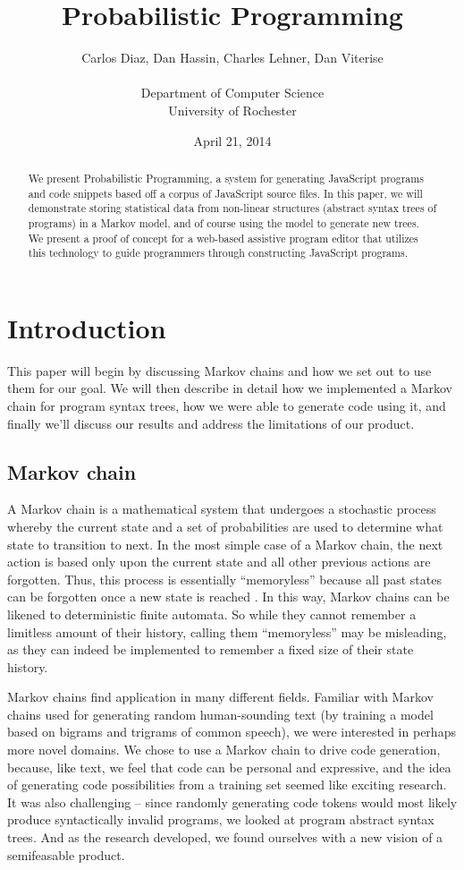 \documentclass{article}
\title{
Probabilistic Programming
}
\author{
	Carlos Diaz, Dan Hassin, Charles Lehner, Dan Viterise \\
    \vspace{0pt}\\ Department of Computer Science \\University of Rochester
}
\date{April 21, 2014}
\begin{document}
\maketitle

\begin{abstract}
	We present Probabilistic Programming, a system for generating JavaScript programs and code snippets based off a corpus of JavaScript source files.
	In this paper, we will demonstrate storing statistical
    data from non-linear structures (abstract syntax trees of programs) in a Markov model,
    and of course using the model to generate new trees. We present a proof of concept for a web-based
    assistive program editor that utilizes this technology to guide programmers through
	constructing JavaScript programs.
\end{abstract}

\section{Introduction}

This paper will begin by discussing Markov chains and how we set out to use them for our goal. We will then describe in detail how we implemented a Markov chain for program syntax trees, how we were able to generate code using it, and finally we'll discuss our results and address the limitations of our product.

\subsection{Markov chain}

A Markov chain is a mathematical system that undergoes a stochastic process whereby
the current state and a set of probabilities are used to determine what state
to transition to next. In the most simple case of a Markov chain, the next action is based
only upon the current state and all other previous actions are forgotten.
Thus, this process is essentially ``memoryless'' because all past states can be
forgotten once a new state is reached \cite{markov}. In this way, Markov chains can be likened
to deterministic finite automata. So while they cannot remember a limitless amount of their history,
calling them ``memoryless'' may be misleading, as they can indeed be implemented to remember a fixed
size of their state history.

Markov chains find application in many different fields. Familiar with Markov chains used for generating random human-sounding text (by training a model based on bigrams and trigrams of common speech), we were interested in perhaps more novel domains. We chose to use a Markov chain to drive code generation, because, like text, we feel that code can be personal and expressive, and the idea of generating code possibilities from a training set seemed like exciting research. It was also challenging -- since randomly generating code tokens would most likely produce syntactically invalid programs, we looked at program abstract syntax trees. And as the research developed, we found ourselves with a new vision of a semifeasable product.
\end{document}
